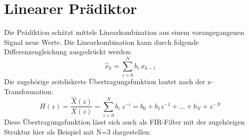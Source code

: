 \documentclass[
    10pt, %
    DIV12,
    english, %
    a5paper, %
    twoside, %
    titlepage, %
    parskip=half, %
    headings=small, %
    listof=totoc, %
    bibliography=totoc, %
    index=totoc, %
    captions=tableheading, %
    final %
]{scrbook}
\begin{document}
\section{Linearer Prädiktor}
Die Prädiktion schätzt mittels Linearkombination aus einem vorangegangenen Signal neue Werte. Die Linearkombination kann 
durch folgende Differenzengleichung ausgedrückt werden:
\begin{equation}\label{linearcombination}
\hat{x}_k=\sum_{i=0}^{N} b_i\:x_{k-i}
\end{equation}
Die zugehörige zeitdiskrete Übertragungsfunktion lautet nach der z-Transformation:
\begin{equation}
H(z)=\frac{\hat{X}(z)}{X(z)}=\sum_{i=0}^{N} b_i\:z^{-i}=b_0+b_1z^{-1}+\dots+b_N+z^{-N}\nonumber
\end{equation}
Diese Übertragungsfunktion lässt sich auch als FIR-Filter mit der zugehörigen Struktur hier als Beispiel mit N=3 dargestellen:\\
\end{document}
